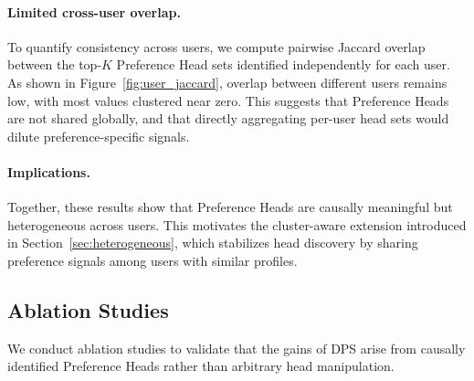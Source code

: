 \documentclass[11pt]{article}
\begin{document}
\paragraph{Limited cross-user overlap.}
To quantify consistency across users, we compute pairwise Jaccard overlap between the top-$K$ Preference Head sets identified independently for each user.
As shown in Figure~\ref{fig:user_jaccard}, overlap between different users remains low, with most values clustered near zero.
This suggests that Preference Heads are not shared globally, and that directly aggregating per-user head sets would dilute preference-specific signals.

\paragraph{Implications.}
Together, these results show that Preference Heads are causally meaningful but heterogeneous across users.
This motivates the cluster-aware extension introduced in Section~\ref{sec:heterogeneous}, which stabilizes head discovery by sharing preference signals among users with similar profiles.

\begin{table}[!t]
\small
\centering
{}
\caption{Estimated inference FLOPs (TFlop) for LLaMA-3-8B with $T=32$ generated tokens.
DPS shares prompt prefill cost with standard decoding and adds a second decoding pass.}
\label{tab:efficiency}
\vspace{-0.3cm}
\end{table}


\subsection{Ablation Studies}
\label{sec:ablation}



We conduct ablation studies to validate that the gains of DPS arise from causally identified Preference Heads rather than arbitrary head manipulation.
\end{document}

